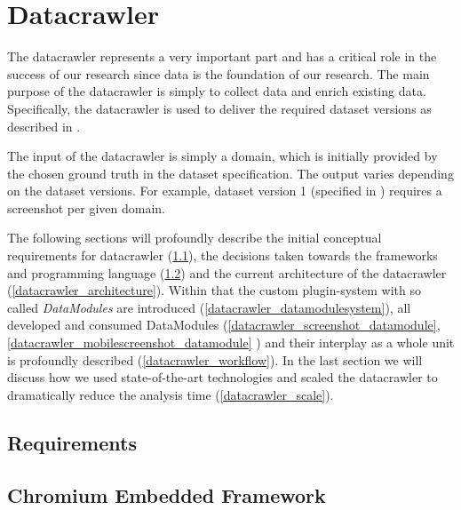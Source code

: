 \section{Datacrawler}
\label{Datacrawler}
The datacrawler represents a very important part and has a critical role in the success of our research since data is the foundation of our research. The main purpose of the datacrawler is simply to collect data and enrich existing data. Specifically, the datacrawler is used to deliver the required dataset versions as described in \label{dataset} .

The input of the datacrawler is simply a domain, which is initially provided by the chosen ground truth in the dataset specification. The output varies depending on the dataset versions. For example, dataset version 1 (specified in \label{datasetversion1})  requires a screenshot per given domain.

The following sections will profoundly describe the initial conceptual requirements for datacrawler (\ref{datacrawler_requirements}), the decisions taken towards the frameworks and programming language (\ref{datacrawler_framework_language}) and the current architecture of the datacrawler (\ref{datacrawler_architecture}). Within that the custom plugin-system with so called \textit{DataModules} are introduced (\ref{datacrawler_datamodulesystem}), all developed and consumed DataModules (\ref{datacrawler_screenshot_datamodule}, \ref{datacrawler_mobilescreenshot_datamodule} ) and their interplay as a whole unit is profoundly described (\ref{datacrawler_workflow}).  In the last section we will discuss how we used state-of-the-art technologies and scaled the datacrawler to dramatically reduce the analysis time (\ref{datacrawler_scale}).

\subsection{Requirements}
\label{datacrawler_requirements}

\subsection{Chromium Embedded Framework}
\label{datacrawler_framework_language}

